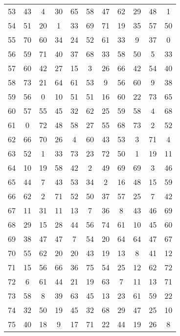 \begin{table}
\begin{tabular}{c c c c c c c c c c c }
53 & 43 & 4 & 30 & 65 & 58 & 47 & 62 & 29 & 48 & 1 \\
54 & 51 & 20 & 1 & 33 & 69 & 71 & 19 & 35 & 57 & 50 \\
55 & 70 & 60 & 34 & 24 & 52 & 61 & 33 & 9 & 37 & 0 \\
56 & 59 & 71 & 40 & 37 & 68 & 33 & 58 & 50 & 5 & 33 \\
57 & 60 & 42 & 27 & 15 & 3 & 26 & 66 & 42 & 54 & 40 \\
58 & 73 & 21 & 64 & 61 & 53 & 9 & 56 & 60 & 9 & 38 \\
59 & 56 & 0 & 10 & 51 & 51 & 16 & 60 & 22 & 73 & 65 \\
60 & 57 & 55 & 45 & 32 & 62 & 25 & 59 & 58 & 4 & 68 \\
61 & 0 & 72 & 48 & 58 & 27 & 55 & 68 & 73 & 2 & 52 \\
62 & 66 & 70 & 26 & 4 & 60 & 43 & 53 & 3 & 71 & 4 \\
63 & 52 & 1 & 33 & 73 & 23 & 72 & 50 & 1 & 19 & 11 \\
64 & 10 & 19 & 58 & 42 & 2 & 49 & 69 & 69 & 3 & 46 \\
65 & 44 & 7 & 43 & 53 & 34 & 2 & 16 & 48 & 15 & 59 \\
66 & 62 & 2 & 71 & 52 & 50 & 37 & 57 & 25 & 7 & 42 \\
67 & 11 & 31 & 11 & 13 & 7 & 36 & 8 & 43 & 46 & 69 \\
68 & 29 & 15 & 28 & 44 & 56 & 74 & 61 & 10 & 45 & 60 \\
69 & 38 & 47 & 47 & 7 & 54 & 20 & 64 & 64 & 47 & 67 \\
70 & 55 & 62 & 20 & 20 & 43 & 19 & 13 & 8 & 41 & 12 \\
71 & 15 & 56 & 66 & 36 & 75 & 54 & 25 & 12 & 62 & 72 \\
72 & 6 & 61 & 44 & 21 & 19 & 63 & 7 & 11 & 13 & 71 \\
73 & 58 & 8 & 39 & 63 & 45 & 13 & 23 & 61 & 59 & 22 \\
74 & 32 & 50 & 19 & 45 & 32 & 68 & 29 & 47 & 25 & 10 \\
75 & 40 & 18 & 9 & 17 & 71 & 22 & 44 & 19 & 26 & 8 \\
\hline
\end{tabular}
\end{table}